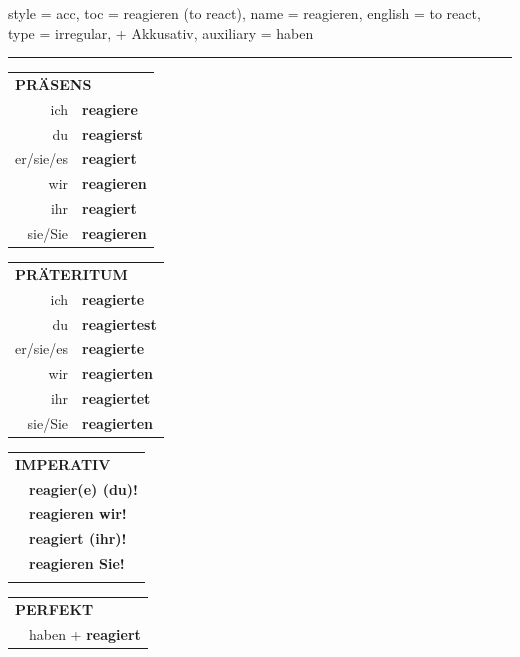 \begin{verbentry}{
  style = {acc},
  toc = {reagieren (to react)},
  name = {reagieren},
  english = {to react},
  type = {irregular, + Akkusativ},
  auxiliary = {haben}
}
 
    
     \vspace{5pt}

    \hrule
    
    \vspace{5pt}

  \begin{tabular}{rl}
     \multicolumn{2}{l}{\textbf{PRÄSENS} }\\
    ich & \textbf{reagiere}\\
    du & \textbf{reagierst}\\
    er/sie/es & \textbf{reagiert}\\
    wir & \textbf{reagieren}\\
    ihr & \textbf{reagiert}\\
    sie/Sie & \textbf{reagieren}\\
  \end{tabular}
  \hfill
     \begin{tabular}{rl}
    \multicolumn{2}{l}{\textbf{PRÄTERITUM} }\\
    ich & \textbf{reagierte}\\
    du & \textbf{reagiertest}\\
    er/sie/es & \textbf{reagierte}\\
    wir & \textbf{reagierten}\\
    ihr & \textbf{reagiertet}\\
    sie/Sie & \textbf{reagierten}\\
  \end{tabular}
  \hfill
  \begin{tabular}{rl}
     \multicolumn{2}{l}{\textbf{IMPERATIV} }\\
   & \textbf{reagier(e) (du)!}\\
   & \textbf{reagieren wir!}\\
   & \textbf{reagiert (ihr)!}\\
   & \textbf{reagieren Sie!}\\
   & \vspace{10pt}
  \end{tabular}

    \vspace{10pt}

 \begin{tabular}{rl}
     \multicolumn{2}{l}{\textbf{PERFEKT}}\\
  &  haben + \textbf{reagiert}\\
  \end{tabular}
\hfill
   \begin{tabular}{rl}
   

\end{tabular}
\end{verbentry}
